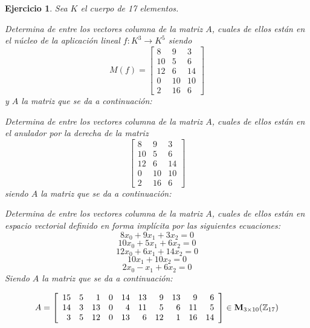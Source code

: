\documentclass[12pt]{amsart}
\newtheorem{ejer}{Ejercicio}
\begin{document}
\begin{ejer} Sea $K$ el cuerpo de 17 elementos.
\newline
\noindent\begin{minipage}{\textwidth}
\begin{tcolorbox}[colback = green!20!white,title=Versión Núcleo]
Determina de entre los vectores columna de la matriz $A$, cuales de ellos están en el núcleo de la aplicación lineal $f:K^{3} \to K^{5}$ siendo  $$ M(f) = \left[\begin{array}{rrr}
8 & 9 & 3 \\
10 & 5 & 6 \\
12 & 6 & 14 \\
0 & 10 & 10 \\
2 & 16 & 6
\end{array}\right] $$ y $A$ la matriz que se da a continuación:\end{tcolorbox}
\end{minipage} \newline
\noindent\begin{minipage}{\textwidth}
\begin{tcolorbox}[colback = blue!20!white,title=Versión Anulador]
Determina de entre los vectores columna de la matriz $A$, cuales de ellos están en el anulador por la derecha de la matriz $$ \left[\begin{array}{rrr}
8 & 9 & 3 \\
10 & 5 & 6 \\
12 & 6 & 14 \\
0 & 10 & 10 \\
2 & 16 & 6
\end{array}\right] $$ siendo $A$ la matriz que se da a continuación:\end{tcolorbox}
\end{minipage} \newline
\noindent\begin{minipage}{\textwidth} 
\begin{tcolorbox}[colback = red!20!white,title=Versión Ecuaciones Implícitas]
Determina de entre los vectores columna de la matriz $A$, cuales de ellos están en espacio vectorial definido en forma implícita por las siguientes ecuaciones:
\[ 8 x_{0} + 9 x_{1} + 3 x_{2} = 0 \]
\[ 10 x_{0} + 5 x_{1} + 6 x_{2} = 0 \]
\[ 12 x_{0} + 6 x_{1} + 14 x_{2} = 0 \]
\[ 10 x_{1} + 10 x_{2} = 0 \]
\[ 2 x_{0} - x_{1} + 6 x_{2} = 0 \]
Siendo $A$ la matriz que se da a continuación:
\end{tcolorbox}
\end{minipage}
\[ A = \left[\begin{array}{rrrrrrrrrr}
15 & 5 & 1 & 0 & 14 & 13 & 9 & 13 & 9 & 6 \\
14 & 3 & 13 & 0 & 4 & 11 & 5 & 6 & 11 & 5 \\
3 & 5 & 12 & 0 & 13 & 6 & 12 & 1 & 16 & 14
\end{array}\right] \in {\bf M}_{3\times 10}({\mathbb Z}_{17})\]
\end{ejer}
\end{document}
